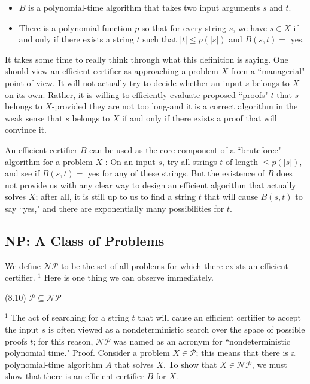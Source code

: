 \documentclass[a4paper, 12pt]{book}
\theoremstyle{dotless}
\begin{document}
\begin{itemize}
  \item $B$ is a polynomial-time algorithm that takes two input arguments $s$ and $t$.

  \item There is a polynomial function $p$ so that for every string $s$, we have $s \in X$ if and only if there exists a string $t$ such that $|t| \leq p(|s|)$ and $B(s, t)=$ yes.

\end{itemize}

It takes some time to really think through what this definition is saying. One should view an efficient certifier as approaching a problem $X$ from a ``managerial" point of view. It will not actually try to decide whether an input $s$ belongs to $X$ on its own. Rather, it is willing to efficiently evaluate proposed ``proofs" $t$ that $s$ belongs to $X$-provided they are not too long-and it is a correct algorithm in the weak sense that $s$ belongs to $X$ if and only if there exists a proof that will convince it.

An efficient certifier $B$ can be used as the core component of a ``bruteforce" algorithm for a problem $X$ : On an input $s$, try all strings $t$ of length $\leq p(|s|)$, and see if $B(s, t)=$ yes for any of these strings. But the existence of $B$ does not provide us with any clear way to design an efficient algorithm that actually solves $X$; after all, it is still up to us to find a string $t$ that will cause $B(s, t)$ to say ``yes," and there are exponentially many possibilities for $t$.

\subsection{NP: A Class of Problems}
We define $\mathcal{N P}$ to be the set of all problems for which there exists an efficient certifier. ${ }^{1}$ Here is one thing we can observe immediately.

(8.10) $\mathcal{P} \subseteq \mathcal{N} \mathcal{P}$

${ }^{1}$ The act of searching for a string $t$ that will cause an efficient certifier to accept the input $s$ is often viewed as a nondeterministic search over the space of possible proofs $t$; for this reason, $\mathcal{N} \mathcal{P}$ was named as an acronym for ``nondeterministic polynomial time." Proof. Consider a problem $X \in \mathcal{P}$; this means that there is a polynomial-time algorithm $A$ that solves $X$. To show that $X \in \mathcal{N} \mathcal{P}$, we must show that there is an efficient certifier $B$ for $X$.
\end{document}
